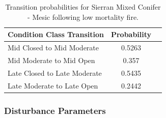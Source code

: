 \begin{table}[htbp]
\small
\centering
\caption{Transition probabilities for Sierran Mixed Conifer - Mesic following low mortality fire.}
\label{smcm_firetrans}
\begin{tabular}{lcc}
\hline
\textbf{Condition Class Transition} & \textbf{Probability}\\
\hline
Mid Closed to Mid Moderate     	& 0.5263   	\\
Mid Moderate to Mid Open    	& 0.357		\\
Late Closed to Late Moderate	& 0.5435    \\
Late Moderate to Late Open     	& 0.2442    \\
\hline
\end{tabular}
\end{table}

\subsubsection{Disturbance Parameters} 

